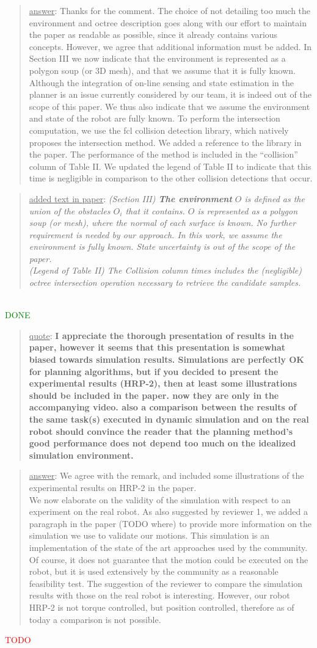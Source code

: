 \documentclass[a4paper]{article}
\newcommand{\done}[0]{\textcolor{green}{DONE}}
\newcommand{\ndone}[0]{\textcolor{red}{TODO}}
\newcommand\quot[1]{\begin{quote} \underline{quote}: \textbf{#1}\end{quote}}
\newcommand\as[1]{\begin{quote} \underline{answer}: {#1}\end{quote} }
\newcommand\qt[1]{\begin{quote} \underline{added text in paper}: \textit{#1}\end{quote} \leavevmode \\ }
\begin{document}
\as{Thanks for the comment. The choice of not detailing too much the environment and octree description goes along with 
our effort to maintain the paper as readable as possible, since it already contains various concepts. However,
we agree that additional information must be added. In Section III we now indicate that the environment is represented as a polygon soup (or 3D mesh), and
that we assume that it is fully known. Although the integration of on-line sensing and state estimation in the planner is an issue currently considered by our team, it is indeed
out of the scope of this paper. We thus also indicate that we assume the environment and state of the robot are fully known. To perform the intersection computation, we use
the fcl collision detection library, which natively proposes the intersection method. We added a reference to the library in the paper. The performance of the method is included
in the ``collision'' column of Table II. We updated the legend of Table II to indicate that this time is negligible in comparison to the other collision detections that occur.
} 
\qt{(Section III) \textbf{The environment} $O$ is defined as the union of the obstacles $O_i$ that it contains. $O$ is represented
as a polygon soup (or mesh), where the normal of each surface is known. No further requirement is needed
by our approach. In this work, we assume the environment is fully known. State uncertainty is out of the scope of the paper. \\
(Legend of Table II)  The Collision column times includes the (negligible) octree intersection operation necessary to retrieve the candidate samples.}
\done

\quot{I appreciate the thorough presentation of results in the paper, however
it seems that this presentation is somewhat biased towards simulation
results. Simulations are perfectly OK for planning algorithms, but if
you decided to present the experimental results (HRP-2), then at least some
illustrations should be included in the paper. now they are only in the
accompanying video.  also a comparison between the results of the same
task(s) executed in dynamic simulation and on the real robot should
convince the reader that the planning method's good performance does
not depend too much on the idealized simulation environment. }
\as{We agree with the remark, and included some illustrations of the experimental results on HRP-2 in the paper. \\
We now elaborate on the validity of the simulation with respect to an experiment on the real robot. As also suggested by reviewer 1, we added a paragraph
in the paper (TODO where) to provide more information on the simulation we use to validate our motions. This simulation is an implementation of the state of the art approaches used by the community. Of course, it does not guarantee that the motion could be executed on the robot, but it is used extensively by the community as a reasonable feasibility test. The suggestion of the reviewer to compare the simulation results with those on the real robot is interesting. However, our robot HRP-2 is not torque controlled, but position controlled, therefore as of today a comparison is not possible.}\ndone
\end{document}

